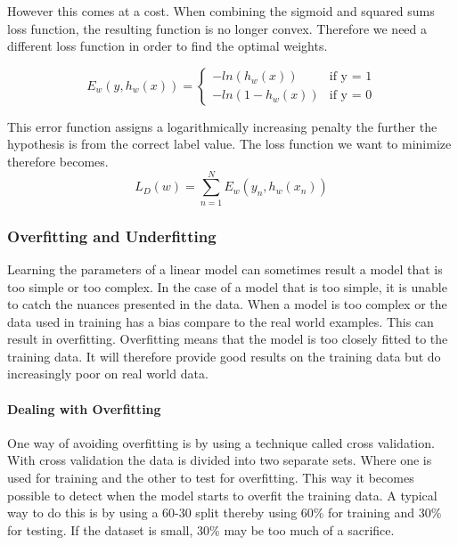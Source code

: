 However this comes at a cost.
When combining the sigmoid and squared sums loss function, the resulting function is no longer convex.
Therefore we need a different loss function in order to find the optimal weights.

$$E_w(y,h_w(x)) = \begin{cases}
	-ln(h_w(x)) &\text{if y = 1}\\	
	-ln(1-h_w(x)) &\text{if y = 0}
\end{cases}$$

This error function assigns a logarithmically increasing penalty the further the hypothesis is from the correct label value.
The loss function we want to minimize therefore becomes. 
$$L_D(w) = \sum_{n=1}^N E_w(y_n, h_w(x_n))$$ 

\subsubsection{Overfitting and Underfitting}
Learning the parameters of a linear model can sometimes result a model that is too simple or too complex.
In the case of a model that is too simple, it is unable to catch the nuances presented in the data.
When a model is too complex or the data used in training has a bias compare to the real world examples.
This can result in overfitting.
Overfitting means that the model is too closely fitted to the training data.
It will therefore provide good results on the training data but do increasingly poor on real world data.

\paragraph{Dealing with Overfitting}

One way of avoiding overfitting is by using a technique called cross validation.
With cross validation the data is divided into two separate sets.
Where one is used for training and the other to test for overfitting. 
This way it becomes possible to detect when the model starts to overfit the training data.
A typical way to do this is by using a 60-30 split thereby using 60\% for training and 30\% for testing.
If the dataset is small, 30\% may be too much of a sacrifice.

